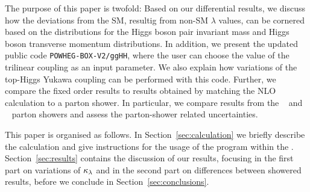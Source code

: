 The purpose of this paper is twofold: Based on our differential results, we discuss how the deviations from the SM, resultig from non-SM $\lambda$ values, can be cornered based on the distributions for the Higgs boson pair invariant mass and Higgs boson transverse momentum distributions. 
In addition, we present the updated public code {\tt POWHEG-BOX-V2/ggHH}, where the user can choose the value of the trilinear coupling as an input parameter.
We also explain how variations of the top-Higgs Yukawa coupling can be performed with this code.
Further, we compare the fixed order results to results obtained by matching the NLO calculation to a parton shower. In particular, we compare results from the \pythia~\cite{Sjostrand:2014zea} and \herwig~\cite{Bellm:2017bvx} parton showers and assess the parton-shower related uncertainties.

This paper is organised as follows. In Section~\ref{sec:calculation} we briefly describe the calculation and give instructions for the usage of the program within the \powhegbox. Section~\ref{sec:results} contains the discussion of our results, focusing in the first part on variations of $\kappa_{\lambda}$ and in the second part on differences between showered results, 
before we conclude in Section~\ref{sec:conclusions}.
